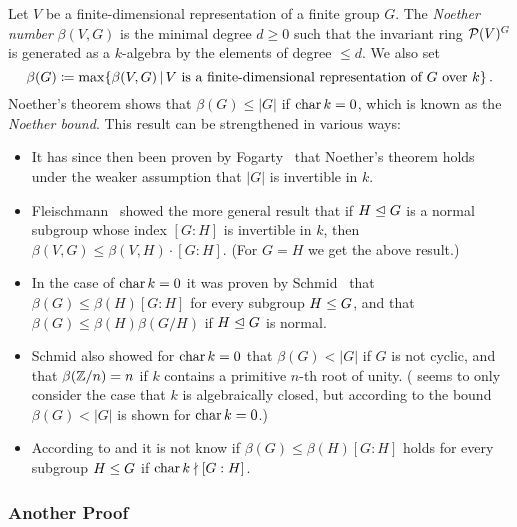 \begin{remark}
  \label{remark: Noether bound}
  Let $V$ be a finite-dimensional representation of a finite group $G$.
  The \emph{Noether number} $\beta(V,G)$ is the minimal degree $d \geq 0$ such that the invariant ring $\mathcal{P}(V)^G$ is generated as a $k$-algebra by the elements of degree $\leq d$.
  We also set
  \[
              \beta(G)
    \defined  \max  \{
                      \beta(V,G)
                    \suchthat
                      \text{$V$ is a finite-dimensional representation of $G$ over $k$}
                    \} \,.
  \]
  Noether’s theorem shows that $\beta(G) \leq |G|$ if $\operatorname{char} k = 0$, which is known as the \emph{Noether bound}.
  This result can be strengthened in various ways:
  \begin{itemize}
    \item
      It has since then been proven by Fogarty~\cite{Fogarty2001} that Noether’s theorem holds under the weaker assumption that $|G|$ is invertible in $k$.
    \item
      Fleischmann~\cite{Fleischmann2000} showed the more general result that if $H \trianglelefteq G$ is a normal subgroup whose index $[G : H]$ is invertible in $k$, then $\beta(V,G) \leq \beta(V,H) \cdot [G : H]$.
      (For $G = H$ we get the above result.)
    \item
      In the case of $\operatorname{char}{k} = 0$ it was proven by Schmid~\cite{Schmid1991} that $\beta(G) \leq \beta(H)[G : H]$ for every subgroup $H \leq G$, and that $\beta(G) \leq \beta(H)\beta(G/H)$ if $H \trianglelefteq G$ is normal.
    \item
      Schmid also showed for $\operatorname{char} k = 0$ that $\beta(G) < |G|$ if $G$ is not cyclic, and that $\beta(\mathbb{Z}/n) = n$ if $k$ contains a primitive $n$-th root of unity.
      (\cite{Schmid1991} seems to only consider the case that $k$ is algebraically closed, but according to \cite[Theorem~3.7]{Wehlau2006} the bound $\beta(G) < |G|$ is shown for $\operatorname{char} k = 0$.)
    \item
      According to \cite[Remark 3.6]{Wehlau2006} and \cite[Remark~3.2.5]{Derksen2015} it is not know if $\beta(G) \leq \beta(H)[G : H]$ holds for every subgroup $H \leq G$ if $\operatorname{char} k \nmid [G : H]$. 
  \end{itemize}
\end{remark}



\subsubsection*{Another Proof}


